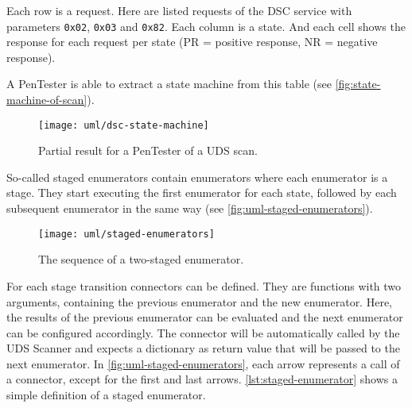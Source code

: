 Each row is a request. Here are listed requests of the DSC service with parameters \texttt{0x02}, \texttt{0x03} and \texttt{0x82}. Each column is a state. And each cell shows the response for each request per state (PR = positive response, NR = negative response).

A PenTester is able to extract a state machine from this table (see \autoref{fig:state-machine-of-scan}).

\begin{figure}[H]
    \centering
    \texttt{[image: uml/dsc-state-machine]}
    \caption{Partial result for a PenTester of a UDS scan.}
    \label{fig:state-machine-of-scan}
\end{figure}

So-called staged enumerators contain enumerators where each enumerator is a stage. They start executing the first enumerator for each state, followed by each subsequent enumerator in the same way (see \autoref{fig:uml-staged-enumerators}).


\begin{figure}[htb]
    \centering
    \texttt{[image: uml/staged-enumerators]}
    \caption{The sequence of a two-staged enumerator.}
    \label{fig:uml-staged-enumerators}
\end{figure}

For each stage transition connectors can be defined. They are functions with two arguments, containing the previous enumerator and the new enumerator. Here, the results of the previous enumerator can be evaluated and the next enumerator can be configured accordingly. The connector will be automatically called by the UDS Scanner and expects a dictionary as return value that will be passed to the next enumerator. In \autoref{fig:uml-staged-enumerators}, each arrow represents a call of a connector, except for the first and last arrows. \autoref{lst:staged-enumerator} shows a simple definition of a staged enumerator.


